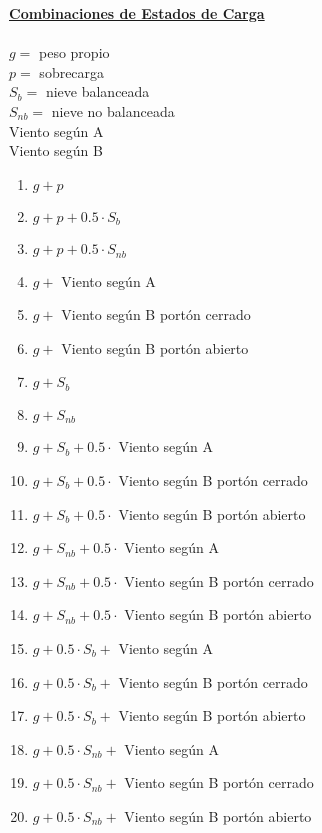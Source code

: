 \begin{enumerate}
\newpage
\textbf{\underline{Combinaciones de Estados de Carga}} \\
\\
$g =$ peso propio\\
$p =$ sobrecarga\\
$S_b =$ nieve balanceada\\
$S_{nb} =$ nieve no balanceada\\
Viento según A\\
Viento según B\\
\begin{enumerate}
	  \item $g+p$
    \item $g+p+0.5 \cdot S_b$
    \item $g+p+0.5 \cdot S_{nb}$
    \item $g+$ Viento según A
    \item $g+$ Viento según B portón cerrado
    \item $g+$ Viento según B portón abierto
    \item $g+S_b$
    \item $g+S_{nb}$
    \item $g+S_b+0.5 \cdot$ Viento según A
    \item $g+S_b+0.5 \cdot$ Viento según B portón cerrado
    \item $g+S_b+0.5 \cdot$ Viento según B portón abierto
    \item $g+S_{nb}+0.5 \cdot$ Viento según A
    \item $g+S_{nb}+0.5 \cdot$ Viento según B portón cerrado
    \item $g+S_{nb}+0.5 \cdot$ Viento según B portón abierto
    \item $g+0.5 \cdot S_b +$ Viento según A
    \item $g+0.5 \cdot S_b +$ Viento según B portón cerrado
    \item $g+0.5 \cdot S_b +$ Viento según B portón abierto
    \item $g+0.5 \cdot S_{nb} +$ Viento según A
    \item $g+0.5 \cdot S_{nb} +$ Viento según B portón cerrado
    \item $g+0.5 \cdot S_{nb} +$ Viento según B portón abierto
\end{enumerate}
\end{enumerate}
